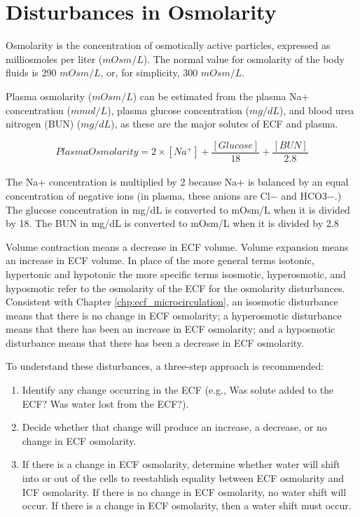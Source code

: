 \section{Disturbances in Osmolarity}

Osmolarity is the concentration of osmotically active particles, expressed as milliosmoles per liter ($mOsm/L$). The normal value for osmolarity of the body fluids is 290 $mOsm/L$, or, for simplicity, 300 $mOsm/L$.

Plasma osmolarity ($mOsm/L$) can be estimated from the plasma Na+ concentration ($mmol/L$), plasma glucose concentration ($mg/dL$), and blood urea nitrogen (BUN) ($mg/dL$), as these are the major solutes of ECF and plasma. 

\begin{equation}
Plasma Osmolarity = 2 \times [Na^+] + \frac{[Glucose]}{18} +\frac{[BUN]}{2.8}
\label{osmolarity}
\end{equation}
\paragraph{}
The Na+ concentration is multiplied by 2 because Na+ is balanced by an equal concentration of negative ions (in plasma, these anions are Cl− and HCO3−.) The glucose concentration in mg/dL is converted to mOsm/L when it is divided by 18. The BUN in mg/dL is converted to mOsm/L when it is divided by 2.8

Volume contraction means a decrease in ECF volume. Volume expansion means an increase in ECF volume. In place of the more general terms isotonic, hypertonic and hypotonic the more specific terms isosmotic, hyperosmotic, and hyposmotic refer to the osmolarity of the ECF for the osmolarity disturbances. Consistent with Chapter \ref{chp:ecf_microcirculation}, an isosmotic disturbance means that there is no change in ECF osmolarity; a hyperosmotic disturbance means that there has been an increase in ECF osmolarity; and a hyposmotic disturbance means that there has been a decrease in ECF osmolarity. 

To understand these disturbances, a three-step approach is recommended:

\begin{enumerate}
\item Identify any change occurring in the ECF (e.g., Was solute added to the ECF? Was water lost from the ECF?).
\item Decide whether that change will produce an increase, a decrease, or no change in ECF osmolarity. 
\item If there is a change in ECF osmolarity, determine whether water will shift into or out of the cells to reestablish equality between ECF osmolarity and ICF osmolarity. If there is no change in ECF osmolarity, no water shift will occur. If there is a change in ECF osmolarity, then a water shift must occur. 
\end{enumerate}

